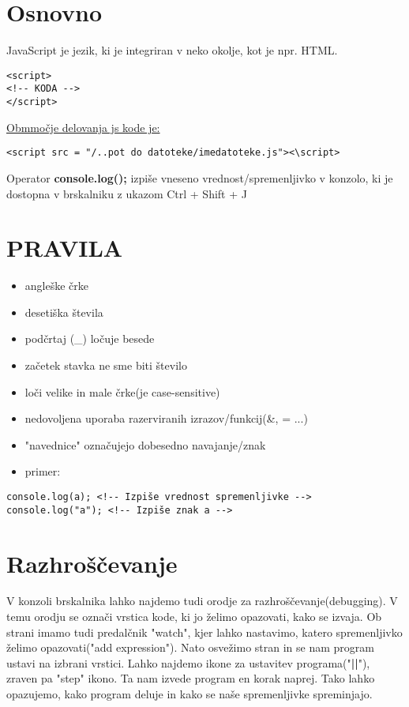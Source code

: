\section{Osnovno}

JavaScript je jezik, ki je integriran v neko okolje, kot je npr. HTML.
\begin{verbatim}
<script>
<!-- KODA -->
</script>
\end{verbatim}

\underline{Obmmočje delovanja js kode je:} 
\begin{verbatim}
<script src = "/..pot do datoteke/imedatoteke.js"><\script>
\end{verbatim}

Operator \textbf{console.log();} izpiše vneseno vrednost/spremenljivko v konzolo, ki je dostopna v brskalniku z ukazom Ctrl + Shift + J


\section{PRAVILA}
\begin{itemize}
	\item angleške črke
	\item desetiška števila
	\item podčrtaj (\_) ločuje besede
	\item začetek stavka ne sme biti število
	\item loči velike in male črke(je case-sensitive) 
	\item nedovoljena uporaba razerviranih izrazov/funkcij(\&, = ...)
	\item "navednice" označujejo dobesedno navajanje/znak
	\item primer:
\end{itemize}

\begin{verbatim}
console.log(a); <!-- Izpiše vrednost spremenljivke -->
console.log("a"); <!-- Izpiše znak a -->
\end{verbatim}

\section{Razhroščevanje}

V konzoli brskalnika lahko najdemo tudi orodje za razhroščevanje(debugging). V temu orodju se označi vrstica kode, ki jo želimo opazovati, kako se izvaja. Ob strani imamo tudi predalčnik "watch", kjer lahko nastavimo, katero spremenljivko želimo opazovati("add expression"). Nato osvežimo stran in se nam program ustavi na izbrani vrstici. Lahko najdemo ikone za ustavitev programa("\textbf{||}"), zraven pa "step" ikono. Ta nam izvede program en korak naprej. Tako lahko opazujemo, kako program deluje in kako se naše spremenljivke spreminjajo.


